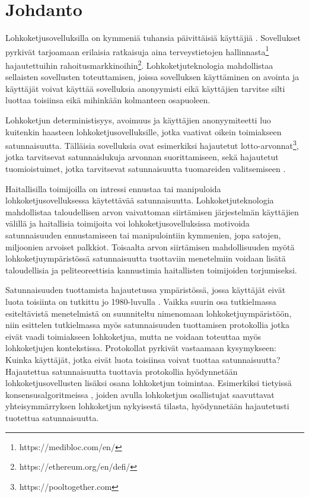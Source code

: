 \chapter{Johdanto\label{intro}}

Lohkoketjusovelluksilla on kymmeniä tuhansia päivittäisiä käyttäjiä \cite{noauthor_state_nodate}. Sovellukset pyrkivät tarjoamaan erilaisia ratkaisuja aina terveystietojen hallinnasta\footnote{https://medibloc.com/en/} hajautettuihin rahoitusmarkkinoihin\footnote{https://ethereum.org/en/defi/}. Lohkoketjuteknologia mahdollistaa sellaisten sovellusten toteuttamisen, joissa sovelluksen käyttäminen on avointa ja käyttäjät voivat käyttää sovelluksia anonyymisti eikä käyttäjien tarvitse silti luottaa toisiinsa eikä mihinkään kolmanteen osapuoleen.

Lohkoketjun deterministisyys, avoimuus ja käyttäjien anonyymiteetti luo kuitenkin haasteen lohkoketjusovelluksille, jotka vaativat oikein toimiakseen satunnaisuutta. Tälläisia sovelluksia ovat esimerkiksi hajautetut lotto-arvonnat\footnote{https://pooltogether.com}, jotka tarvitsevat satunnaislukuja arvonnan suorittamiseen, sekä hajautetut tuomioistuimet, jotka tarvitsevat satunnaisuutta tuomareiden valitsemiseen \cite{lesaege_kleros_2020}. 

Haitallisilla toimijoilla on intressi ennustaa tai manipuloida lohkoketjusovelluksessa käytettävää satunnaisuutta. Lohkoketjuteknologia mahdollistaa taloudellisen arvon vaivattoman siirtämisen järjestelmän käyttäjien välillä ja haitallisia toimijoita voi lohkoketjusovelluksissa motivoida satunnaisuuden ennustamiseen tai manipulointiin kymmenien, jopa satojen, miljoonien arvoiset palkkiot. Toisaalta arvon siirtämisen mahdollisuuden myötä lohkoketjuympäristössä satunnaisuutta tuottaviin menetelmiin voidaan lisätä taloudellisia ja peliteoreettisia kannustimia haitallisten toimijoiden torjumiseksi.

Satunnaisuuden tuottamista hajautetussa ympäristössä, jossa käyttäjät eivät luota toisiinta on tutkittu jo 1980-luvulla \cite{10.1145/1008908.1008911}. Vaikka suurin osa tutkielmassa esiteltävistä menetelmistä on suunniteltu nimenomaan lohkoketjuympäristöön, niin esittelen tutkielmassa myös satunnaisuuden tuottamisen protokollia jotka eivät vaadi toimiakseen lohkoketjua, mutta ne voidaan toteuttaa myös lohkoketjujen kontekstissa. Protokollat pyrkivät vastaamaan kysymykseen: Kuinka käyttäjät, jotka eivät luota toisiinsa voivat tuottaa satunnaisuutta? Hajautettua satunnaisuutta tuottavia protokollia hyödynnetään lohkoketjusovellusten lisäksi osana lohkoketjun toimintaa. Esimerkiksi tietyissä konsensusalgoritmeissa \cite{gilad_algorand_2017, hanke_dfinity_2018}, joiden avulla lohkoketjun osallistujat saavuttavat yhteisymmärryksen lohkoketjun nykyisestä tilasta, hyödynnetään hajautetusti tuotettua satunnaisuutta.

